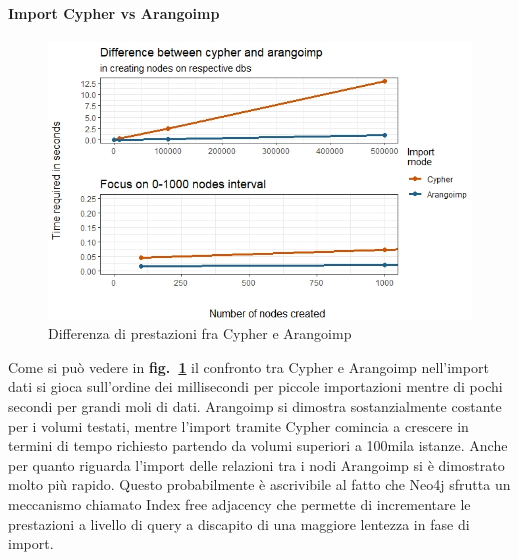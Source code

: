 \documentclass[fleqn,10pt]{SelfArx} %
\begin{document}
{{\paragraph{Import Cypher vs Arangoimp}
\begin{figure}
\centering
\includegraphics[scale=0.54]{viz_benchmark_cypher_arangoimp.jpeg}
\caption{\label{plot_cypher_arangoimp} Differenza di prestazioni fra Cypher e Arangoimp}
\end{figure}
Come si può vedere in \textbf{fig.~\ref{plot_cypher_arangoimp}} il confronto tra Cypher e Arangoimp nell'import dati si gioca sull'ordine dei millisecondi per piccole importazioni mentre di pochi secondi per grandi moli di dati. Arangoimp si dimostra sostanzialmente costante per i volumi testati, mentre l'import tramite Cypher comincia a crescere in termini di tempo richiesto partendo da volumi superiori a 100mila istanze. Anche per quanto riguarda l'import delle relazioni tra i nodi Arangoimp si è dimostrato molto più rapido. Questo probabilmente è ascrivibile al fatto che Neo4j sfrutta un meccanismo chiamato Index free adjacency che permette di incrementare le prestazioni a livello di query a discapito di una maggiore lentezza in fase di import. 
}}
\end{document}
